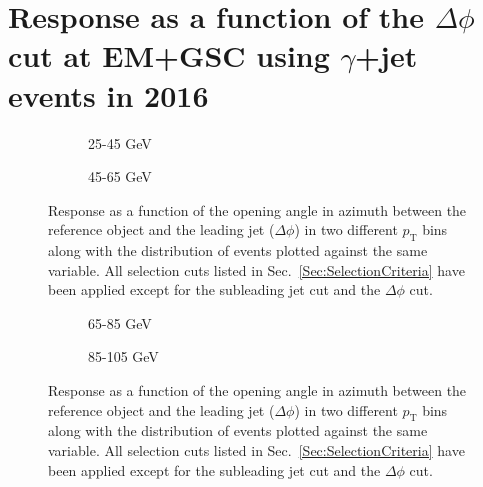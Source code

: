 \chapter{Response as a function of the $\Delta\phi$ cut at EM+GSC using $\gamma$+jet events in 2016}

\begin{figure}[!ht]
\centering
\begin{subfigure}{.5\textwidth}
\centering
{}
\caption{25-45 GeV}
\end{subfigure}%
\begin{subfigure}{.5\textwidth}
\centering
{}
\caption{45-65 GeV}
\end{subfigure}
  \caption[Response as a function of the $\Delta\phi$ cut, 25-45 and 45-65 GeV bins]
  {\small Response as a function of the opening angle in azimuth between the reference object and the leading jet ($\Delta\phi$) in two different $p_{\mathrm T}$ bins along with the distribution of events plotted against the same variable.  All selection cuts listed in Sec.~\ref{Sec:SelectionCriteria} have been applied except for the subleading jet cut and the $\Delta\phi$ cut.  }
  \label{plot:GJetEMdPhi25-45_2016App}
\end{figure}

\begin{figure}[!ht]
  \centering
  \begin{subfigure}{.5\textwidth}
    \centering
    \caption{65-85 GeV}
  \end{subfigure}%
  \begin{subfigure}{.5\textwidth}
    \centering
    \caption{85-105 GeV}
  \end{subfigure}
  \caption[Response as a function of the $\Delta\phi$ cut, 65-85 and 85-105 GeV bins]
  {\small Response as a function of the opening angle in azimuth between the reference object and the leading jet ($\Delta\phi$) in two different $p_{\mathrm T}$ bins along with the distribution of events plotted against the same variable.  All selection cuts listed in Sec.~\ref{Sec:SelectionCriteria} have been applied except for the subleading jet cut and the $\Delta\phi$ cut.  }
  \label{plot:GJetEMdPhi65-85_2016App}
\end{figure}

